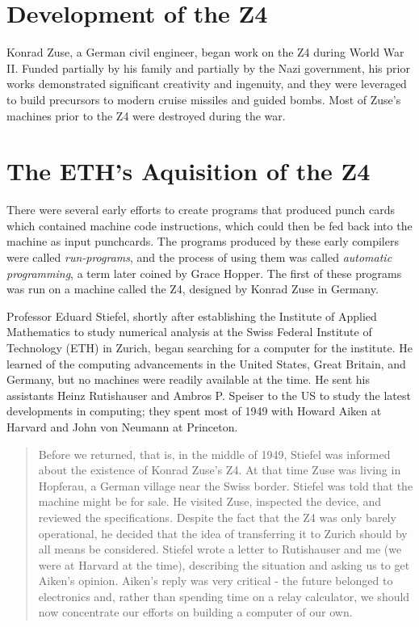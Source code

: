 
\section{Development of the Z4}

Konrad Zuse, a German civil engineer, began work on the Z4 during World War II.
Funded partially by his family and partially by the Nazi government, his prior works
demonstrated significant creativity and ingenuity, and they were leveraged to build
precursors to modern cruise missiles and guided bombs.
Most of Zuse's machines prior to the Z4 were destroyed during the war.


\section{The ETH's Aquisition of the Z4}

There were several early efforts to create programs that produced punch cards
which contained machine code instructions, which could then be fed back into the machine
as input punchcards.
The programs produced by these early compilers were called \textit{run-programs},
and the process of using them was called \textit{automatic programming}, a term later
coined by Grace Hopper.
The first of these programs was run on a machine called the Z4, designed by Konrad Zuse in Germany.

Professor Eduard Stiefel, shortly after establishing the Institute of Applied Mathematics
to study numerical analysis at the Swiss Federal Institute of Technology (ETH) in Zurich,
began searching for a computer for the institute.
He learned of the computing advancements in the United States, Great Britain, and Germany,
but no machines were readily available at the time.
He sent his assistants Heinz Rutishauser and Ambros P. Speiser to the US to study
the latest developments in computing; they spent most of 1949 with
Howard Aiken at Harvard and John von Neumann at Princeton.

\begin{quotation}
Before we returned, that is, in the middle of 1949, Stiefel was informed about the existence of Konrad Zuse's
Z4. At that time Zuse was living in Hopferau, a German village near the Swiss border. Stiefel was told that
the machine might be for sale. He visited Zuse, inspected the device, and reviewed the specifications.
Despite the fact that the Z4 was only barely operational, he decided that the idea of transferring it to Zurich
should by all means be considered. Stiefel wrote a letter to Rutishauser and me (we were at Harvard at the
time), describing the situation and asking us to get Aiken's opinion. Aiken's reply was very critical - the
future belonged to electronics and, rather than spending time on a relay calculator, we should now
concentrate our efforts on building a computer of our own.\cite{konrad-zuses-z4-2000}
\end{quotation}

